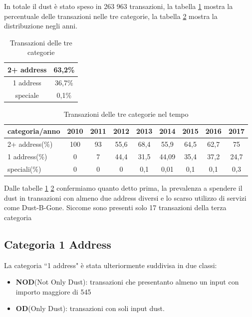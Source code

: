 In totale il dust è stato speso in 263 963 transazioni, la tabella \ref{tab:tx_categories} mostra la percentuale delle transazioni nelle tre categorie, la tabella \ref{tab:tx_categories_year} mostra la distribuzione negli anni.
\begin{table}[H]
    \centering
    \begin{tabular}{|c|c|}
        \hline
        2+ address & 63,2\%\\
        \hline
        1 address & 36,7\%\\
        \hline
        speciale & 0,1\%\\
        \hline
    \end{tabular}
    \caption{Transazioni delle tre categorie}
    \label{tab:tx_categories}
\end{table}
\begin{table}[H]
    \centering
    \begin{tabular}{|l|c|c|c|c|c|c|c|c|}
        \hline
            categoria/anno  & 2010 & 2011 & 2012 & 2013 & 2014 & 2015 & 2016 & 2017\\
        \hline 
         2+ address(\%) & 100 & 93 & 55,6 & 68,4 & 55,9 & 64,5 & 62,7 & 75 \\
         \hline
         1 address(\%) & 0 & 7 & 44,4 & 31,5 & 44,09 & 35,4 & 37,2 & 24,7  \\
         \hline
         speciali(\%) & 0 & 0 & 0 & 0,1 & 0,01 & 0,1 & 0,1 & 0,3 \\
         \hline
    \end{tabular}
    \caption{Transazioni delle tre categorie nel tempo}
    \label{tab:tx_categories_year}
\end{table}
Dalle tabelle \ref{tab:tx_categories} \ref{tab:tx_categories_year} confermiamo quanto detto prima, la prevalenza a spendere il dust in transazioni con almeno due address diversi e lo scarso utilizzo di servizi come Dust-B-Gone. Siccome sono presenti solo 17 transazioni della terza categoria 
\subsection{Categoria 1 Address}
La categoria ``1 address" è stata ulteriormente suddivisa in due classi:
\begin{itemize}
    \item \textbf{NOD}(Not Only Dust): transazioni che presentanto almeno un input con importo maggiore di 545  
    \item \textbf{OD}(Only Dust): transazioni con soli input dust.
\end{itemize}

